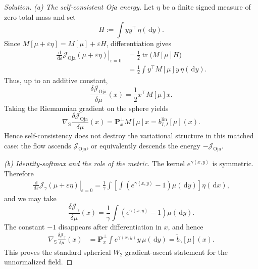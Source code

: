\documentclass[11pt]{amsart}
\numberwithin{equation}{section}
\theoremstyle{plain}
\newcommand{\dd}{\,\mathrm{d}}
\newcommand{\ip}[2]{\left\langle#1,#2\right\rangle}
\begin{document}
\begin{proof}[Solution]
\emph{(a) The self-consistent Oja energy.}
Let $\eta$ be a finite signed measure of zero total mass and set
\[
 H:=\int yy^\top\,\eta(\dd y).
\]
Since $M[\mu+\varepsilon\eta]=M[\mu]+\varepsilon H$, differentiation gives
\begin{align*}
 \left.\frac{\dd}{\dd\varepsilon}
 \mathcal J_{\mathrm{Oja}}(\mu+\varepsilon\eta)
 \right|_{\varepsilon=0}
 &=\frac12\operatorname{tr}\bigl(M[\mu]H\bigr)\\
 &=\frac12\int y^\top M[\mu]y\,\eta(\dd y).
\end{align*}
Thus, up to an additive constant,
\[
 \frac{\delta\mathcal J_{\mathrm{Oja}}}{\delta\mu}(x)
 =\frac12x^\top M[\mu]x.
\]
Taking the Riemannian gradient on the sphere yields
\[
 \nabla_{\mathbb S}
 \frac{\delta\mathcal J_{\mathrm{Oja}}}{\delta\mu}(x)
 =\mathbf P_x^\perp M[\mu]x
 =b_{I,I}^{\mathrm{lin}}[\mu](x).
\]
Hence self-consistency does not destroy the variational structure in this
matched case: the flow ascends $\mathcal J_{\mathrm{Oja}}$, or equivalently
descends the energy $-\mathcal J_{\mathrm{Oja}}$.

\emph{(b) Identity-softmax and the role of the metric.}
The kernel $e^{\gamma\ip{x}{y}}$ is symmetric.  Therefore
\begin{align*}
 \left.\frac{\dd}{\dd\varepsilon}
 \mathcal J_\gamma(\mu+\varepsilon\eta)
 \right|_{\varepsilon=0}
 =\frac1\gamma\int
 \left[\int\left(e^{\gamma\ip{x}{y}}-1\right)\mu(\dd y)\right]
 \eta(\dd x),
\end{align*}
and we may take
\[
 \frac{\delta\mathcal J_\gamma}{\delta\mu}(x)
 =\frac1\gamma\int
 \left(e^{\gamma\ip{x}{y}}-1\right)\mu(\dd y).
\]
The constant $-1$ disappears after differentiation in $x$, and hence
\begin{align*}
 \nabla_{\mathbb S}
 \frac{\delta\mathcal J_\gamma}{\delta\mu}(x)
 &=\mathbf P_x^\perp\int
 e^{\gamma\ip{x}{y}}y\,\mu(\dd y) =\widetilde b_\gamma[\mu](x).
\end{align*}
This proves the standard spherical $W_2$ gradient-ascent statement for the
unnormalized field.


\end{proof}
\end{document}
